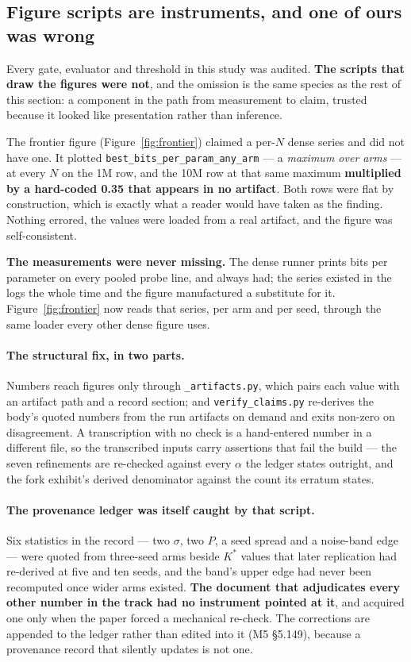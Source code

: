 \subsection{Figure scripts are instruments, and one of ours was wrong}
\label{sec:figinstrument}

Every gate, evaluator and threshold in this study was audited. \textbf{The scripts that draw the
figures were not}, and the omission is the same species as the rest of this section: a component in
the path from measurement to claim, trusted because it looked like presentation rather than
inference.

The frontier figure (Figure~\ref{fig:frontier}) claimed a per-$N$ dense series and did not have one.
It plotted \texttt{best\_bits\_per\_param\_any\_arm} --- a \emph{maximum over arms} --- at every $N$
on the 1M row, and the 10M row at that same maximum \textbf{multiplied by a hard-coded 0.35 that
appears in no artifact}. Both rows were flat by construction, which is exactly what a reader would
have taken as the finding. Nothing errored, the values were loaded from a real artifact, and the
figure was self-consistent.

\textbf{The measurements were never missing.} The dense runner prints bits per parameter on every
pooled probe line, and always had; the series existed in the logs the whole time and the figure
manufactured a substitute for it. Figure~\ref{fig:frontier} now reads that series, per arm and per
seed, through the same loader every other dense figure uses.

\paragraph{The structural fix, in two parts.} Numbers reach figures only through
\texttt{\_artifacts.py}, which pairs each value with an artifact path and a record section; and
\texttt{verify\_claims.py} re-derives the body's quoted numbers from the run artifacts on demand and
exits non-zero on disagreement. A transcription with no check is a hand-entered number in a
different file, so the transcribed inputs carry assertions that fail the build --- the seven
refinements are re-checked against every $\alpha$ the ledger states outright, and the fork exhibit's
derived denominator against the count its erratum states.

\paragraph{The provenance ledger was itself caught by that script.} Six statistics in the record ---
two $\sigma$, two $P$, a seed spread and a noise-band edge --- were quoted from three-seed arms
beside $K^*$ values that later replication had re-derived at five and ten seeds, and the band's upper
edge had never been recomputed once wider arms existed. \textbf{The document that adjudicates every
other number in the track had no instrument pointed at it}, and acquired one only when the paper
forced a mechanical re-check. The corrections are appended to the ledger rather than edited into it
(M5 \S5.149), because a provenance record that silently updates is not one.

